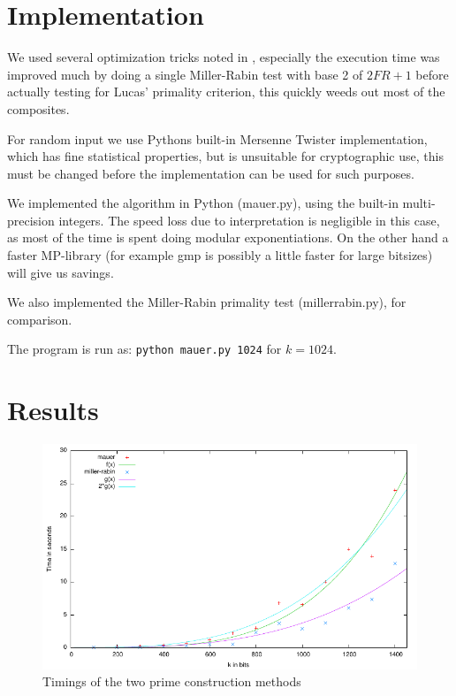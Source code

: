 \documentclass[11pt,a4paper]{article}
\begin{document}
\section{Implementation}

We used several optimization tricks noted in \cite{Menezes:1997:HAC}, especially the
execution time was improved much by doing a single Miller-Rabin test
with base 2 of $2FR+1$ before actually testing for Lucas' primality
criterion, this quickly weeds out most of the composites.

For random input we use Pythons built-in Mersenne Twister
implementation, which has fine statistical properties, but is
unsuitable for cryptographic use, this must be changed before the
implementation can be used for such purposes.

We implemented the algorithm in Python (mauer.py), using the built-in
multi-precision integers.  The speed loss due to interpretation is
negligible in this case, as most of the time is spent doing modular
exponentiations. On the other hand a faster MP-library (for example
gmp is possibly a little faster for large bitsizes) will give us
savings.

We also implemented the Miller-Rabin primality test (millerrabin.py),
for comparison.

The program is run as: \verb|python mauer.py 1024| for $k=1024$.

\section{Results}
\begin{figure}[h]
  \centering
  \includegraphics{plot.pdf}
  \caption{Timings of the two prime construction methods}
  \label{fig:timings}
\end{figure}
\end{document}
